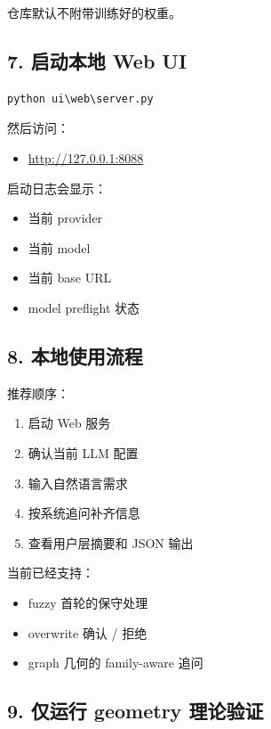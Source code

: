 \documentclass[11pt,a4paper]{ctexart}
\begin{document}
仓库默认不附带训练好的权重。

\subsection*{7. 启动本地 Web UI}

\begin{verbatim}
python ui\web\server.py
\end{verbatim}

然后访问：

\begin{itemize}
\item \url{http://127.0.0.1:8088}
\end{itemize}

启动日志会显示：

\begin{itemize}
\item 当前 provider
\item 当前 model
\item 当前 base URL
\item model preflight 状态
\end{itemize}

\subsection*{8. 本地使用流程}

推荐顺序：

\begin{enumerate}
\item 启动 Web 服务
\item 确认当前 LLM 配置
\item 输入自然语言需求
\item 按系统追问补齐信息
\item 查看用户层摘要和 JSON 输出
\end{enumerate}

当前已经支持：

\begin{itemize}
\item fuzzy 首轮的保守处理
\item overwrite 确认 / 拒绝
\item graph 几何的 family-aware 追问
\end{itemize}

\subsection*{9. 仅运行 geometry 理论验证}
\end{document}
